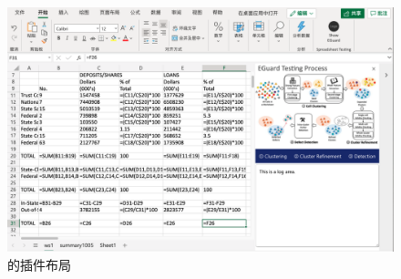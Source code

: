\begin{figure}[tp]   
    \centering
    \includegraphics[width=\textwidth]{figure/eg/eguard-1.png}
    \caption{\eg 的插件布局}
    \label{figure-eg1}
\end{figure}